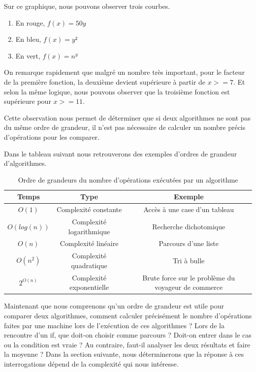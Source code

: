 \documentclass[12pt, twoside, openright]{report}
\begin{document}
Sur ce graphique, nous pouvons observer trois courbes.

\begin{enumerate}
    \item En rouge, $f(x)=50y$
    \item En bleu, $f(x)=y²$
    \item En vert, $f(x)=n^{y}$
\end{enumerate}

On remarque rapidement que malgré un nombre très important, pour le facteur de la première fonction, la deuxième devient supérieure à partir de $x>=7$. Et selon la même logique, nous pouvons observer que la troisième fonction est supérieure pour $x>=11$. 

Cette observation nous permet de déterminer que si deux algorithmes ne sont pas du même ordre de grandeur, il n'est pas nécessaire de calculer un nombre précis d'opérations pour les comparer.

Dans le tableau suivant nous retrouverons des exemples d'ordres de grandeur d'algorithmes.  \cite{moore02} 
\begin{center}
    \begin{table}
        \begin{tabular}{|c|c|c|}
            \hline 
    Temps & Type & Exemple \\ 
            \hline 
    $O(1)$        &Complexité constante&  Accès à une case d'un tableau\\ 
            \hline 
    $O(log(n))$       & Complexité logarithmique  & Recherche dichotomique \\ 
            \hline 
    $O(n)$        & Complexité linéaire & Parcours d'une liste \\ 
            \hline 
    $O(n^{2})$        & Complexité quadratique  & Tri à bulle \\ 
            \hline 
    $2^{O(n)}$ & Complexité exponentielle & Brute force sur le problème du voyageur de commerce \\
            \hline
        \end{tabular}
    \caption{\label{table:complexite}Ordre de grandeurs du nombre d'opérations exécutées par un algorithme}
    \end{table}
\end{center}

Maintenant que nous comprenons qu'un ordre de grandeur est utile pour comparer deux algorithmes, comment calculer précisément le nombre d'opérations faites par une machine lors de l'exécution de ces algorithmes ? Lors de la rencontre d'un if, que doit-on choisir comme parcours ? Doit-on entrer dans le cas ou la condition est vraie ? Au contraire, faut-il analyser les deux résultats et faire la moyenne ? Dans la section suivante, nous déterminerons que la réponse à ces interrogations dépend de la complexité qui nous intéresse.
\end{document}
